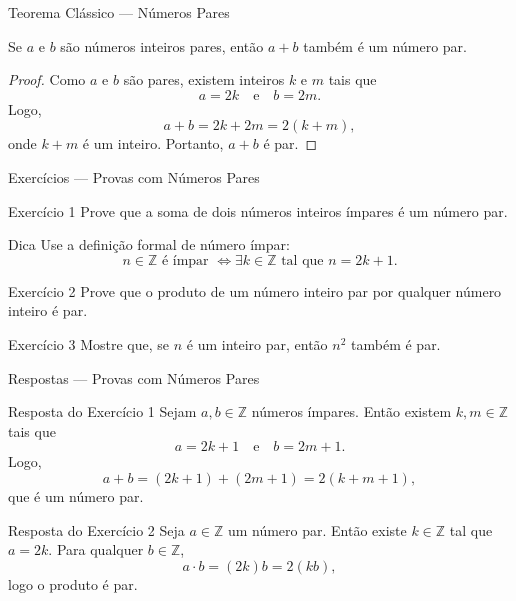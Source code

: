 \documentclass[9pt]{beamer}
\begin{document}
\begin{frame}{Teorema Clássico — Números Pares}

\begin{theorem}
Se \(a\) e \(b\) são números inteiros pares, então \(a + b\) também é um número par.
\end{theorem}

\begin{proof}
Como \(a\) e \(b\) são pares, existem inteiros \(k\) e \(m\) tais que
\[
a = 2k \quad \text{e} \quad b = 2m.
\]
Logo,
\[
a + b = 2k + 2m = 2(k+m),
\]
onde \(k+m\) é um inteiro. Portanto, \(a + b\) é par.
\end{proof}

\end{frame}
\begin{frame}{Exercícios — Provas com Números Pares}

\begin{block}{Exercício 1}
Prove que a soma de dois números inteiros ímpares é um número par.
\end{block}

\begin{block}{Dica}
Use a definição formal de número ímpar:
\[
n \in \mathbb{Z} \text{ é ímpar } \iff \exists k \in \mathbb{Z}
\text{ tal que } n = 2k + 1.
\]
\end{block}
\vspace{0.3cm}

\begin{block}{Exercício 2}
Prove que o produto de um número inteiro par por qualquer número inteiro é par.
\end{block}

\vspace{0.3cm}

\begin{block}{Exercício 3}
Mostre que, se \( n \) é um inteiro par, então \( n^2 \) também é par.
\end{block}

\vspace{0.3cm}


\end{frame}
\begin{frame}{Respostas — Provas com Números Pares}

\begin{block}{Resposta do Exercício 1}
Sejam \(a,b \in \mathbb{Z}\) números ímpares.  
Então existem \(k,m \in \mathbb{Z}\) tais que
\[
a = 2k+1 \quad \text{e} \quad b = 2m+1.
\]
Logo,
\[
a+b = (2k+1)+(2m+1) = 2(k+m+1),
\]
que é um número par.
\end{block}

\vspace{0.3cm}

\begin{block}{Resposta do Exercício 2}
Seja \(a \in \mathbb{Z}\) um número par.  
Então existe \(k \in \mathbb{Z}\) tal que \(a = 2k\).
Para qualquer \(b \in \mathbb{Z}\),
\[
a\cdot b = (2k)b = 2(kb),
\]
logo o produto é par.
\end{block}

\vspace{0.3cm}
\end{frame}
\end{document}
